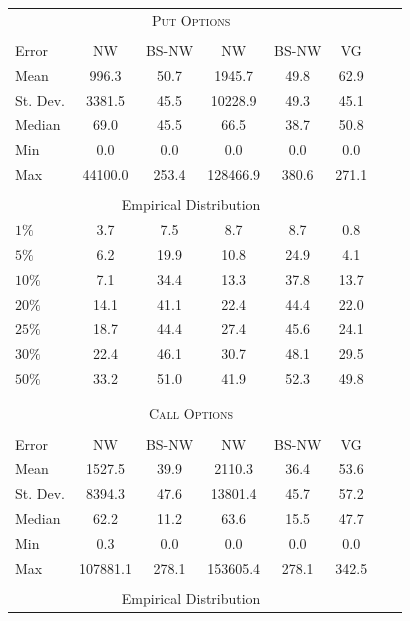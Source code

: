 \begin{center} 
 \begin{tabular*}{\textwidth}{@{\extracolsep{\fill}}lccccccc} 
 \toprule 
 \multicolumn{6}{c}{\textsc{Put Options}}\\ 
 \multicolumn{6}{c}{}\\ 
Error &NW & BS-NW & NW\raisebox{-.4ex}{\tiny CV} & BS-NW\raisebox{-.4ex}{\tiny CV} & VG \\  
 \midrule 
Mean       & 996.3& 50.7& 1945.7& 49.8& 62.9\\ 
St. Dev.   & 3381.5& 45.5& 10228.9& 49.3& 45.1\\ 
Median     & 69.0& 45.5& 66.5& 38.7& 50.8\\ 
Min        & 0.0& 0.0& 0.0& 0.0& 0.0\\ 
Max        & 44100.0& 253.4& 128466.9& 380.6& 271.1\\ 
 \multicolumn{6}{c}{}\\ 
 \multicolumn{6}{c}{Empirical Distribution}\\ 
 \midrule 
$1\%$      & 3.7& 7.5& 8.7& 8.7& 0.8\\ 
$5\%$      & 6.2& 19.9& 10.8& 24.9& 4.1\\ 
$10\%$     & 7.1& 34.4& 13.3& 37.8& 13.7\\ 
$20\%$     & 14.1& 41.1& 22.4& 44.4& 22.0\\ 
$25\%$     & 18.7& 44.4& 27.4& 45.6& 24.1\\ 
$30\%$     & 22.4& 46.1& 30.7& 48.1& 29.5\\ 
$50\%$     & 33.2& 51.0& 41.9& 52.3& 49.8\\ 
 \multicolumn{6}{c}{}\\ 
 \multicolumn{6}{c}{}\\ 
 \toprule 
 \multicolumn{6}{c}{\textsc{Call Options}}\\ 
 \multicolumn{6}{c}{}\\ 
Error & NW & BS-NW & NW\raisebox{-.4ex}{\tiny CV} & BS-NW\raisebox{-.4ex}{\tiny CV} & VG \\  
 \midrule 
Mean       & 1527.5& 39.9& 2110.3& 36.4& 53.6\\ 
St. Dev.   & 8394.3& 47.6& 13801.4& 45.7& 57.2\\ 
Median     & 62.2& 11.2& 63.6& 15.5& 47.7\\ 
Min        & 0.3& 0.0& 0.0& 0.0& 0.0\\ 
Max        & 107881.1& 278.1& 153605.4& 278.1& 342.5\\ 
 \multicolumn{6}{c}{}\\ 
 \multicolumn{6}{c}{Empirical Distribution}\\ 

\end{tabular*}
\end{center}
